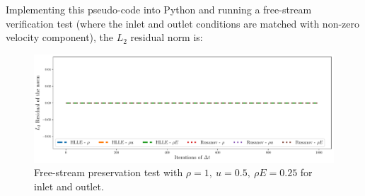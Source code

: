 \begin{enumerate}[label=\alph*., start = 1]
    Implementing this pseudo-code into Python and running a free-stream verification test (where the inlet and outlet conditions are matched with non-zero velocity component), the $L_2$ residual norm is:

    \begin{figure}[h]
        \centering
        \includegraphics[width = \linewidth]{q2/verification.pdf}
        \caption{Free-stream preservation test with  $\rho=1,\ u=0.5,\ \rho E = 0.25$ for inlet and outlet.}
        \label{fig:q2_residuals}
    \end{figure}
\end{enumerate}

